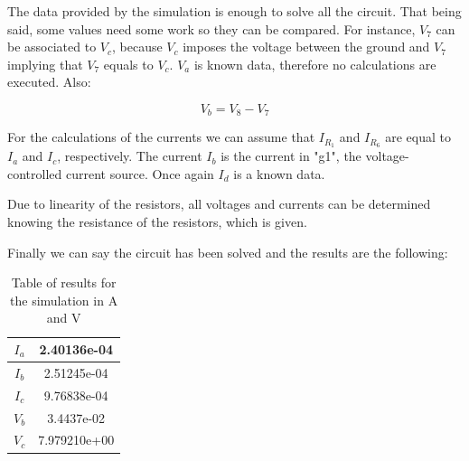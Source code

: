 \par The data provided by the simulation is enough to solve all the circuit.
That being said, some values need some work so they can be compared. For instance, $V_7$ can be associated  to $V_c$, because $V_c$ imposes the voltage between the ground and $V_7$ implying that $V_7$ equals to $V_c$. $V_a$ is known data, therefore no calculations are executed. Also:

\begin{equation}
	V_b=V_{8}-V_{7}
\end{equation}

\par For the calculations of the currents we can assume that $I_{R_{1}}$ and $I_{R_{6}}$ are equal to $I_a$ and $I_c$, respectively. The current $I_b$ is the current in "g1", the voltage-controlled current source. Once again $I_d$ is a known data.
\par Due to linearity of the resistors, all voltages and currents can be determined knowing the resistance of the resistors, which is given.
\par Finally we can say the circuit has been solved and the results are the following:
\begin{table}[H]
    \centering
    \begin{tabular}{|c|c|}
    \hline
        $I_a$ & 2.40136e-04\\ \hline
        $I_b$ & 2.51245e-04\\ \hline
        $I_c$ & 9.76838e-04\\ \hline
        $V_b$ & 3.4437e-02\\ \hline
        $V_c$ & 7.979210e+00\\ \hline
    \end{tabular}
    \caption{Table of results for the simulation in A and V}
\end{table}







